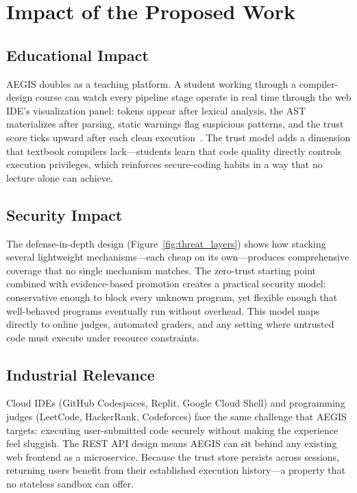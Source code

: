 \documentclass[conference]{IEEEtran}
\begin{document}
\section{Impact of the Proposed Work}
\label{sec:impact}

\subsection{Educational Impact}

AEGIS doubles as a teaching platform.  A student working through
a compiler-design course can watch every pipeline stage operate
in real time through the web IDE's visualization panel:
tokens appear after lexical analysis, the AST materializes after
parsing, static warnings flag suspicious patterns, and the
trust score ticks upward after each clean
execution~\cite{aho2007compilers}.  The trust model adds a
dimension that textbook compilers lack---students learn that
code quality directly controls execution privileges, which
reinforces secure-coding habits in a way that no lecture alone
can achieve.

\subsection{Security Impact}

The defense-in-depth design (Figure~\ref{fig:threat_layers})
shows how stacking several lightweight mechanisms---each cheap
on its own---produces comprehensive coverage that no single
mechanism matches.  The zero-trust starting point combined with
evidence-based promotion creates a practical security model:
conservative enough to block every unknown program, yet
flexible enough that well-behaved programs eventually run
without overhead.  This model maps directly to online judges,
automated graders, and any setting where untrusted code must
execute under resource constraints.

\subsection{Industrial Relevance}

Cloud IDEs (GitHub Codespaces, Replit, Google Cloud Shell) and
programming judges (LeetCode, HackerRank, Codeforces) face the
same challenge that AEGIS targets: executing user-submitted
code securely without making the experience feel sluggish.
The REST API design means AEGIS can sit behind any existing web
frontend as a microservice.  Because the trust store persists
across sessions, returning users benefit from their established
execution history---a property that no stateless sandbox can
offer.
\end{document}
